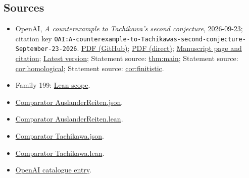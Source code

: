 \documentclass[11pt]{article}
\begin{document}
\subsection{Sources}
\begin{itemize}
\item OpenAI, \emph{A counterexample to Tachikawa's second conjecture}, 2026-09-23; citation key \texttt{OAI:A-counterexample-to-Tachikawas-second-conjecture-September-23-2026}. \href{https://github.com/openai/math/blob/adc7f1241b42e322a6451854ab7e4b4c146bf78a/preprints/A-counterexample-to-Tachikawas-second-conjecture-September-23-2026/paper.pdf}{PDF (GitHub)}; \href{https://github.com/openai/math/raw/adc7f1241b42e322a6451854ab7e4b4c146bf78a/preprints/A-counterexample-to-Tachikawas-second-conjecture-September-23-2026/paper.pdf}{PDF (direct)}; \href{https://github.com/openai/math/blob/adc7f1241b42e322a6451854ab7e4b4c146bf78a/preprints/A-counterexample-to-Tachikawas-second-conjecture-September-23-2026/README.md}{Manuscript page and citation}; \href{https://github.com/openai/math/blob/main/preprints/A-counterexample-to-Tachikawas-second-conjecture-September-23-2026/paper.pdf}{Latest version}; Statement source: \href{https://github.com/openai/math/blob/adc7f1241b42e322a6451854ab7e4b4c146bf78a/preprints/A-counterexample-to-Tachikawas-second-conjecture-September-23-2026/build/sections/introduction.tex\#L23}{thm:main}; Statement source: \href{https://github.com/openai/math/blob/adc7f1241b42e322a6451854ab7e4b4c146bf78a/preprints/A-counterexample-to-Tachikawas-second-conjecture-September-23-2026/build/sections/introduction.tex\#L267}{cor:homological}; Statement source: \href{https://github.com/openai/math/blob/adc7f1241b42e322a6451854ab7e4b4c146bf78a/preprints/A-counterexample-to-Tachikawas-second-conjecture-September-23-2026/build/sections/introduction.tex\#L305}{cor:finitistic}.
\item Family 199: \href{https://github.com/openai/math/blob/adc7f1241b42e322a6451854ab7e4b4c146bf78a/lean/docs/199.md}{Lean scope}.
\item \href{https://github.com/openai/math/blob/adc7f1241b42e322a6451854ab7e4b4c146bf78a/lean/ComparatorChallenges/AuslanderReiten.json}{Comparator AuslanderReiten.json}.
\item \href{https://github.com/openai/math/blob/adc7f1241b42e322a6451854ab7e4b4c146bf78a/lean/ComparatorChallenges/AuslanderReiten.lean}{Comparator AuslanderReiten.lean}.
\item \href{https://github.com/openai/math/blob/adc7f1241b42e322a6451854ab7e4b4c146bf78a/lean/ComparatorChallenges/Tachikawa.json}{Comparator Tachikawa.json}.
\item \href{https://github.com/openai/math/blob/adc7f1241b42e322a6451854ab7e4b4c146bf78a/lean/ComparatorChallenges/Tachikawa.lean}{Comparator Tachikawa.lean}.
\item \href{https://github.com/openai/math/blob/adc7f1241b42e322a6451854ab7e4b4c146bf78a/CONTENTS.md}{OpenAI catalogue entry}.
\end{itemize}
\end{document}
